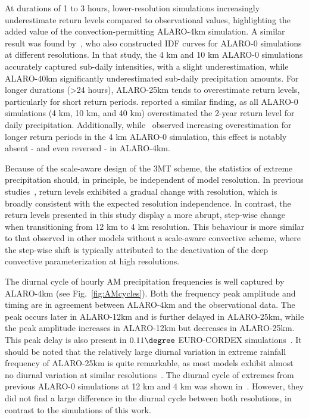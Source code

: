 \documentclass[journal abbreviation, manuscript]{copernicus}
\begin{document}
At durations of 1 to 3 hours, lower-resolution simulations increasingly underestimate return levels compared to observational values, highlighting the added value of the convection-permitting ALARO-4km simulation. 
A similar result was found by~\citet{tabari_local_2016}, who also constructed IDF curves for ALARO-0 simulations at different resolutions. 
In that study, the 4 km and 10 km ALARO-0 simulations accurately captured sub-daily intensities, with a slight underestimation, while ALARO-40km significantly underestimated sub-daily precipitation amounts. 
For longer durations (>24 hours), ALARO-25km tends to overestimate return levels, particularly for short return periods. 
\citet{de_troch_application_2016} reported a similar finding, as all ALARO-0 simulations (4 km, 10 km, and 40 km) overestimated the 2-year return level for daily precipitation. 
Additionally, while~\citet{de_troch_application_2016} observed increasing overestimation for longer return periods in the 4 km ALARO-0 simulation, this effect is notably absent - and even reversed - in ALARO-4km.

Because of the scale-aware design of the 3MT scheme, the statistics of extreme precipitation should, in principle, be independent of model resolution. 
In previous studies~\citep{de_troch_application_2016, tabari_local_2016}, return levels exhibited a gradual change with resolution, which is broadly consistent with the expected resolution independence. 
In contrast, the return levels presented in this study display a more abrupt, step-wise change when transitioning from 12 km to 4 km resolution. 
This behaviour is more similar to that observed in other models without a scale-aware convective scheme, where the step-wise shift is typically attributed to the deactivation of the deep convective parameterization at high resolutions.

The diurnal cycle of hourly AM precipitation frequencies is well captured by ALARO-4km (see Fig.~\ref{fig:AMcycles}).
Both the frequency peak amplitude and timing are in agreement between ALARO-4km and the observational data.
The peak occurs later in ALARO-12km and is further delayed in ALARO-25km, while the peak amplitude increases in ALARO-12km but decreases in ALARO-25km.
This peak delay is also present in $0.11\degree$ EURO-CORDEX simulations~\citep{meredith_present_2021}.
It should be noted that the relatively large diurnal variation in extreme rainfall frequency of ALARO-25km is quite remarkable, as most models exhibit almost no diurnal variation at similar resolutions~\citep{meredith_present_2021, thomassen_spatial_2023}.
The diurnal cycle of extremes from previous ALARO-0 simulations at 12 km and 4 km was shown in~\citet{van_de_vyver_evaluation_2021}. 
However, they did not find a large difference in the diurnal cycle between both resolutions, in contrast to the simulations of this work. 
\end{document}
